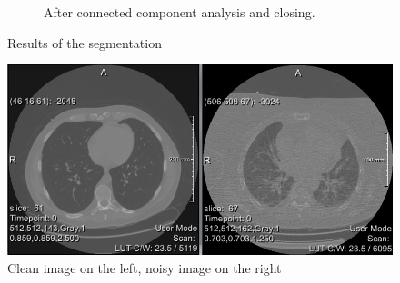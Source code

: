 \documentclass[a4paper,10pt]{article}
\numberwithin{equation}{section} %
\numberwithin{figure}{section} %
\numberwithin{table}{section} %
\begin{document}
\begin{figure}[h]
\begin{subfigure}[b]{0.45\textwidth}
        \caption{After connected component analysis and closing.}
        \label{fig:lungs}
    \end{subfigure}
    \caption{Results of the segmentation}\label{fig:lung-segmentation}
\end{figure}

\begin{figure}[h]
	\centering
	\includegraphics[scale=0.7]{Noisy_and_clean}
	\caption{Clean image on the left, noisy image on the right}
	\label{fig:noisy}
\end{figure}




\end{document}
